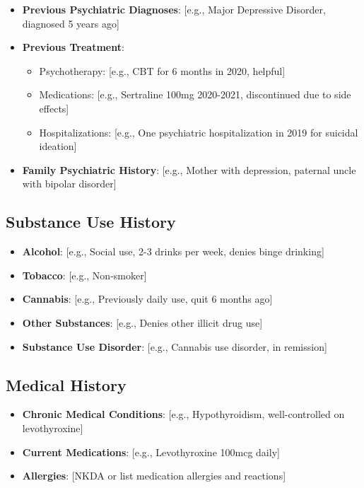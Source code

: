 \documentclass[11pt,letterpaper]{article}
\begin{document}
\begin{itemize}[leftmargin=*]
    \item \textbf{Previous Psychiatric Diagnoses}: [e.g., Major Depressive Disorder, diagnosed 5 years ago]
    \item \textbf{Previous Treatment}:
    \begin{itemize}
        \item Psychotherapy: [e.g., CBT for 6 months in 2020, helpful]
        \item Medications: [e.g., Sertraline 100mg 2020-2021, discontinued due to side effects]
        \item Hospitalizations: [e.g., One psychiatric hospitalization in 2019 for suicidal ideation]
    \end{itemize}
    \item \textbf{Family Psychiatric History}: [e.g., Mother with depression, paternal uncle with bipolar disorder]
\end{itemize}

\subsection*{Substance Use History}

\begin{itemize}[leftmargin=*]
    \item \textbf{Alcohol}: [e.g., Social use, 2-3 drinks per week, denies binge drinking]
    \item \textbf{Tobacco}: [e.g., Non-smoker]
    \item \textbf{Cannabis}: [e.g., Previously daily use, quit 6 months ago]
    \item \textbf{Other Substances}: [e.g., Denies other illicit drug use]
    \item \textbf{Substance Use Disorder}: [e.g., Cannabis use disorder, in remission]
\end{itemize}

\subsection*{Medical History}

\begin{itemize}[leftmargin=*]
    \item \textbf{Chronic Medical Conditions}: [e.g., Hypothyroidism, well-controlled on levothyroxine]
    \item \textbf{Current Medications}: [e.g., Levothyroxine 100mcg daily]
    \item \textbf{Allergies}: [NKDA or list medication allergies and reactions]
\end{itemize}
\end{document}
